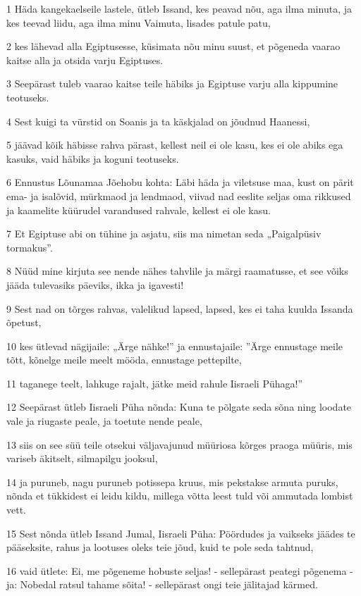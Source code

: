 \par 1 Häda kangekaelseile lastele, ütleb Issand, kes peavad nõu, aga ilma minuta, ja kes teevad liidu, aga ilma minu Vaimuta, lisades patule patu,
\par 2 kes lähevad alla Egiptusesse, küsimata nõu minu suust, et põgeneda vaarao kaitse alla ja otsida varju Egiptuses.
\par 3 Seepärast tuleb vaarao kaitse teile häbiks ja Egiptuse varju alla kippumine teotuseks.
\par 4 Sest kuigi ta vürstid on Soanis ja ta käskjalad on jõudnud Haanessi,
\par 5 jäävad kõik häbisse rahva pärast, kellest neil ei ole kasu, kes ei ole abiks ega kasuks, vaid häbiks ja koguni teotuseks.
\par 6 Ennustus Lõunamaa Jõehobu kohta: Läbi häda ja viletsuse maa, kust on pärit ema- ja isalõvid, mürkmaod ja lendmaod, viivad nad eeslite seljas oma rikkused ja kaamelite küürudel varandused rahvale, kellest ei ole kasu.
\par 7 Et Egiptuse abi on tühine ja asjatu, siis ma nimetan seda „Paigalpüsiv tormakus”.
\par 8 Nüüd mine kirjuta see nende nähes tahvlile ja märgi raamatusse, et see võiks jääda tulevasiks päeviks, ikka ja igavesti!
\par 9 Sest nad on tõrges rahvas, valelikud lapsed, lapsed, kes ei taha kuulda Issanda õpetust,
\par 10 kes ütlevad nägijaile: „Ärge nähke!” ja ennustajaile: ”Ärge ennustage meile tõtt, kõnelge meile meelt mööda, ennustage pettepilte,
\par 11 taganege teelt, lahkuge rajalt, jätke meid rahule Iisraeli Pühaga!”
\par 12 Seepärast ütleb Iisraeli Püha nõnda: Kuna te põlgate seda sõna ning loodate vale ja riugaste peale, ja toetute nende peale,
\par 13 siis on see süü teile otsekui väljavajunud müüriosa kõrges praoga müüris, mis variseb äkitselt, silmapilgu jooksul,
\par 14 ja puruneb, nagu puruneb potissepa kruus, mis pekstakse armuta puruks, nõnda et tükkidest ei leidu kildu, millega võtta leest tuld või ammutada lombist vett.
\par 15 Sest nõnda ütleb Issand Jumal, Iisraeli Püha: Pöördudes ja vaikseks jäädes te pääseksite, rahus ja lootuses oleks teie jõud, kuid te pole seda tahtnud,
\par 16 vaid ütlete: Ei, me põgeneme hobuste seljas! - sellepärast peategi põgenema - ja: Nobedal ratsul tahame sõita! - sellepärast ongi teie jälitajad kärmed.
